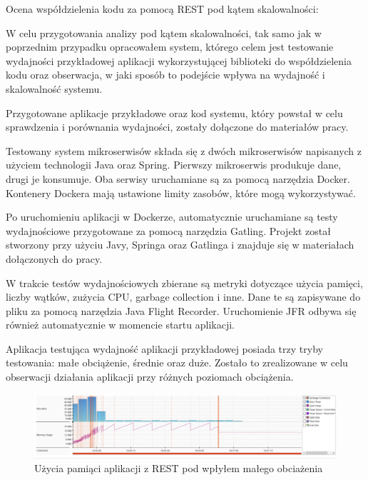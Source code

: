 \documentclass[runningheads,12pt]{llncs}
\begin{document}
\newpage


Ocena współdzielenia kodu za pomocą REST pod kątem skalowalności:

W celu przygotowania analizy pod kątem skalowalności, tak samo jak w poprzednim przypadku opracowałem system, którego celem jest testowanie wydajności przykładowej aplikacji wykorzystującej biblioteki do współdzielenia kodu oraz obserwacja, w jaki sposób to podejście wpływa na wydajność i skalowalność systemu.

Przygotowane aplikacje przykładowe oraz kod systemu, który powstał w celu sprawdzenia i porównania wydajności, zostały dołączone do materiałów pracy.

Testowany system mikroserwisów składa się z dwóch mikroserwisów napisanych z użyciem technologii Java oraz Spring. Pierwszy mikroserwis produkuje dane, drugi je konsumuje. Oba serwisy uruchamiane są za pomocą narzędzia Docker. Kontenery Dockera mają ustawione limity zasobów, które mogą wykorzystywać.

Po uruchomieniu aplikacji w Dockerze, automatycznie uruchamiane są testy wydajnościowe przygotowane za pomocą narzędzia Gatling. Projekt został stworzony przy użyciu Javy, Springa oraz Gatlinga i znajduje się w materiałach dołączonych do pracy.

W trakcie testów wydajnościowych zbierane są metryki dotyczące użycia pamięci, liczby wątków, zużycia CPU, garbage collection i inne. Dane te są zapisywane do pliku za pomocą narzędzia Java Flight Recorder. Uruchomienie JFR odbywa się również automatycznie w momencie startu aplikacji.

Aplikacja testująca wydajność aplikacji przykładowej posiada trzy tryby testowania: małe obciążenie, średnie oraz duże. Zostało to zrealizowane w celu obserwacji działania aplikacji przy różnych poziomach obciążenia.

\begin{figure}
    \includegraphics[width=\linewidth]{images/rest-memory-low-graph.jpg}
    \caption{Użycia pamiąci aplikacji z REST pod wpłyłem małego obciażenia} \label{fig1}
\end{figure}
\end{document}

